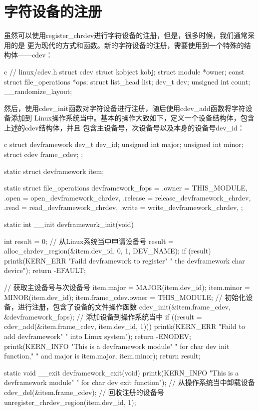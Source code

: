 \section{字符设备的注册}
虽然可以使用register\_chrdev进行字符设备的注册，但是，很多时候，我们通常采用的是
更为现代的方式和函数。新的字符设备的注册，需要使用到一个特殊的结构体——cdev：
\begin{code-block}{c}
// linux/cdev.h
struct cdev {
        struct kobject kobj;
        struct module *owner;
        const struct file_operations *ops;
        struct list_head list;
        dev_t dev;
        unsigned int count;
} __randomize_layout;
\end{code-block}
然后，使用cdev\_init函数对字符设备进行注册，随后使用cdev\_add函数将字符设备添加到
Linux操作系统当中。基本的操作大致如下，定义一个设备结构体，包含上述的cdev结构体，并且
包含主设备号，次设备号以及本身的设备号dev\_id：
\begin{code-block}{c}
struct devframework {
        dev_t dev_id;
        unsigned int major;
        unsigned int minor;
        struct cdev frame_cdev;
};

static struct devframework item;

static struct file_operations devframework_fops = {
        .owner = THIS_MODULE,
        .open = open_devframework_chrdev,
        .release = release_devframework_chrdev,
        .read = read_devframework_chrdev,
        .write = write_devframework_chrdev,
};

static int __init devframework_init(void)
{
        int result = 0;
        // 从Linux系统当中申请设备号
        result = alloc_chrdev_region(&item.dev_id, 0, 1, DEV_NAME);
        if (result) {
                printk(KERN_ERR
                        "Faild devframework to register"
                        " the devframework char device\n");
                return -EFAULT;
        }

        // 获取主设备号与次设备号
        item.major = MAJOR(item.dev_id);
        item.minor = MINOR(item.dev_id);
        item.frame_cdev.owner = THIS_MODULE;
        // 初始化设备，进行注册，包含了设备的文件操作函数
        cdev_init(&item.frame_cdev, &devframework_fops);
        // 添加设备到操作系统当中
        if ((result = cdev_add(&item.frame_cdev, item.dev_id, 1))){
                printk(KERN_ERR "Faild to add devframework"
                                " into Linux system\n");
                return -ENODEV;
        }
        printk(KERN_INFO
                "This is a devframework module"
                " for char dev init function,"
                " and major is %
                item.major, item.minor);
        return result;
}

static void __exit devframework_exit(void)
{
        printk(KERN_INFO
                "This is a devframework module"
                " for char dev exit function\n");
        // 从操作系统当中卸载设备
        cdev_del(&item.frame_cdev);
        // 回收注册的设备号
        unregister_chrdev_region(item.dev_id, 1);
}
\end{code-block}

